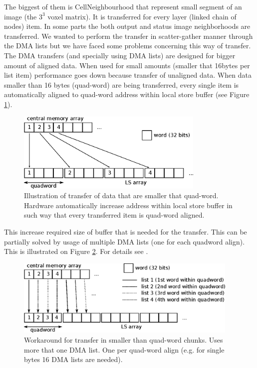 \par
The biggest of them is CellNeighbourhood that represent small segment of an image (the $3^3$ voxel matrix).
It is transferred for every layer (linked chain of nodes) item.
In some parts the both output and status image neighborhoods are transferred.
We wanted to perform the transfer in scatter-gather manner through the DMA lists but we have faced some problems concerning this way of transfer.
The DMA transfers (and specially using DMA lists) are designed for bigger amount of aligned data.
When used for small amounts (smaller that 16bytes per list item) performance goes down because transfer of unaligned data.
When data smaller than 16 bytes (quad-word) are being transferred, every single item is automatically aligned to quad-word address within local store buffer (see Figure \ref{fg:automaticAlignOfSmallData}).

\begin{figure}
    \centering
    \includegraphics[width=0.8\textwidth]{data/automaticAlignOfSmallData}
    \caption[automatic align of small data]
{
  Illustration of transfer of data that are smaller that quad-word.
  Hardware automatically increase address within local store buffer in such way that every transferred item is quad-word aligned.
}
    \label{fg:automaticAlignOfSmallData}
\end{figure}

This increase required size of buffer that is needed for the transfer.
This can be partially solved by usage of multiple DMA lists (one for each quadword align).
This is illustrated on Figure \ref{fg:multipleDMAList}.
For details see \cite{DMAListIssues}.

\begin{figure}
    \centering
    \includegraphics[width=0.95\textwidth]{data/multipleDMAList}
    \caption[multiple DMA list workaround]
{
  Workaround for transfer in smaller than quad-word chunks.
  Uses more that one DMA list.
  One per quad-word align (e.g. for single bytes 16 DMA lists are needed).
}
    \label{fg:multipleDMAList}
\end{figure}

